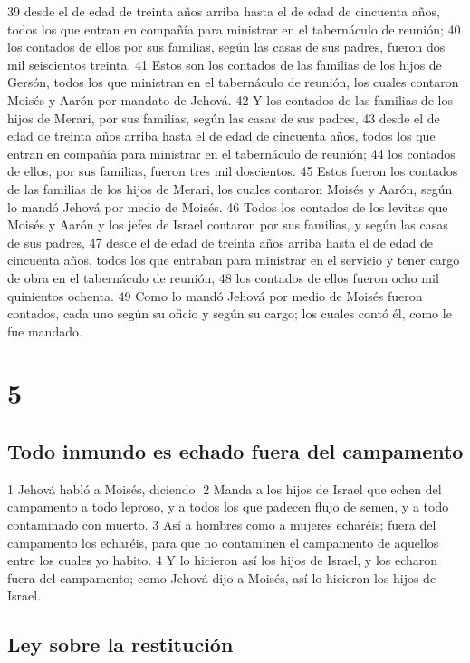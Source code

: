39 desde el de edad de treinta años arriba hasta el de edad de cincuenta años, todos los que entran en compañía para ministrar en el tabernáculo de reunión;
40 los contados de ellos por sus familias, según las casas de sus padres, fueron dos mil seiscientos treinta.
41 Estos son los contados de las familias de los hijos de Gersón, todos los que ministran en el tabernáculo de reunión, los cuales contaron Moisés y Aarón por mandato de Jehová.
42 Y los contados de las familias de los hijos de Merari, por sus familias, según las casas de sus padres,
43 desde el de edad de treinta años arriba hasta el de edad de cincuenta años, todos los que entran en compañía para ministrar en el tabernáculo de reunión;
44 los contados de ellos, por sus familias, fueron tres mil doscientos.
45 Estos fueron los contados de las familias de los hijos de Merari, los cuales contaron Moisés y Aarón, según lo mandó Jehová por medio de Moisés.
46 Todos los contados de los levitas que Moisés y Aarón y los jefes de Israel contaron por sus familias, y según las casas de sus padres,
47 desde el de edad de treinta años arriba hasta el de edad de cincuenta años, todos los que entraban para ministrar en el servicio y tener cargo de obra en el tabernáculo de reunión,
48 los contados de ellos fueron ocho mil quinientos ochenta.
49 Como lo mandó Jehová por medio de Moisés fueron contados, cada uno según su oficio y según su cargo; los cuales contó él, como le fue mandado.

\chapter{5}

\section*{Todo inmundo es echado fuera del campamento}


1 Jehová habló a Moisés, diciendo:
2 Manda a los hijos de Israel que echen del campamento a todo leproso, y a todos los que padecen flujo de semen, y a todo contaminado con muerto.
3 Así a hombres como a mujeres echaréis; fuera del campamento los echaréis, para que no contaminen el campamento de aquellos entre los cuales yo habito.
4 Y lo hicieron así los hijos de Israel, y los echaron fuera del campamento; como Jehová dijo a Moisés, así lo hicieron los hijos de Israel.
\section*{Ley sobre la restitución}

